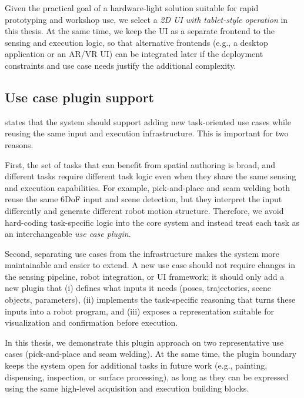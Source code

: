 Given the practical goal of a hardware-light solution suitable for rapid prototyping and workshop use, we select a \emph{2D UI with tablet-style operation} in this thesis. At the same time, we keep the UI as a separate frontend to the sensing and execution logic, so that alternative frontends (e.g., a desktop application or an AR/VR UI) can be integrated later if the deployment constraints and use case needs justify the additional complexity.



\subsection{Use case plugin support} \label{subsec:ch2_analysis_use_case_plugins}

 states that the system should support adding new task-oriented use cases while reusing the same input and execution infrastructure. This is important for two reasons.

First, the set of tasks that can benefit from spatial authoring is broad, and different tasks require different task logic even when they share the same sensing and execution capabilities. For example, pick-and-place and seam welding both reuse the same 6DoF input and scene detection, but they interpret the input differently and generate different robot motion structure. Therefore, we avoid hard-coding task-specific logic into the core system and instead treat each task as an interchangeable \emph{use case plugin}.

Second, separating use cases from the infrastructure makes the system more maintainable and easier to extend. A new use case should not require changes in the sensing pipeline, robot integration, or UI framework; it should only add a new plugin that (i) defines what inputs it needs (poses, trajectories, scene objects, parameters), (ii) implements the task-specific reasoning that turns these inputs into a robot program, and (iii) exposes a representation suitable for visualization and confirmation before execution.

In this thesis, we demonstrate this plugin approach on two representative use cases (pick-and-place and seam welding). At the same time, the plugin boundary keeps the system open for additional tasks in future work (e.g., painting, dispensing, inspection, or surface processing), as long as they can be expressed using the same high-level acquisition and execution building blocks.



